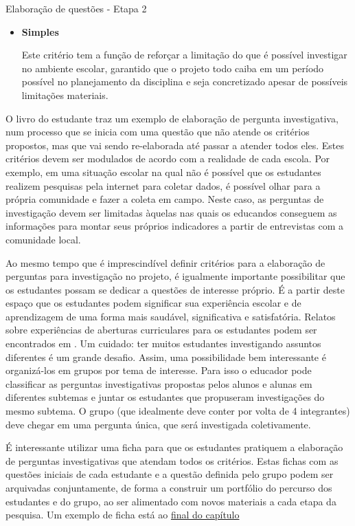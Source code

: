 \begin{paginatexto}{Elaboração de questões - Etapa 2}
{\begin{itemize}
\item \textbf{Simples}

Este critério tem a função de reforçar a limitação do que é possível investigar no ambiente escolar, garantido que o projeto todo caiba em um período possível no planejamento da disciplina e seja concretizado apesar de possíveis limitações materiais.
\end{itemize}

O livro do estudante traz um exemplo de elaboração de pergunta investigativa, num processo que se inicia com uma questão que não atende os critérios propostos, mas que vai sendo re-elaborada até passar a atender todos eles. Estes critérios devem ser modulados de acordo com a realidade de cada escola. Por exemplo, em uma situação escolar na qual não é possível que os estudantes realizem pesquisas pela internet para coletar dados, é possível olhar para a própria comunidade e fazer a coleta em campo. Neste caso, as perguntas de investigação devem ser limitadas àquelas nas quais os educandos conseguem as informações para montar seus próprios indicadores a partir de entrevistas com a comunidade local.

Ao mesmo tempo que é imprescindível definir critérios para a elaboração de perguntas para investigação no projeto, é igualmente importante possibilitar que os estudantes possam se dedicar a questões de interesse próprio. É a partir deste espaço que os estudantes podem significar sua experiência escolar e de aprendizagem de uma forma mais saudável, significativa e satisfatória. Relatos sobre experiências de aberturas curriculares para os estudantes podem ser encontrados em \citep{singer2010,appleton2017,hecht2016}.
Um cuidado: ter muitos estudantes investigando assuntos diferentes é um grande desafio. Assim, uma possibilidade bem interessante é organizá-los em grupos por tema de interesse. Para isso o educador pode classificar as perguntas investigativas propostas pelos alunos e alunas em diferentes subtemas e juntar os estudantes que propuseram investigações do mesmo subtema. O grupo (que idealmente deve conter por volta de 4 integrantes) deve chegar em uma pergunta única, que será investigada coletivamente.

É interessante utilizar uma ficha para que os estudantes pratiquem a elaboração de perguntas investigativas que atendam todos os critérios. Estas fichas com as questões iniciais de cada estudante e a questão definida pelo grupo podem ser arquivadas conjuntamente, de forma a construir um portfólio do percurso dos estudantes e do grupo, ao ser alimentado com novos materiais a cada etapa da pesquisa. Um exemplo de ficha está ao \hyperref[elaboracao-questoes]{final do capítulo}

}
\end{paginatexto}

